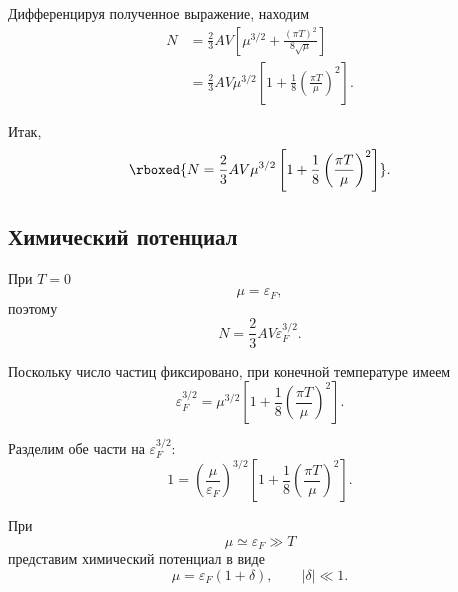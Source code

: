 \documentclass[../final.tex]{subfiles}
\begin{document}
Дифференцируя полученное выражение, находим
%
\begin{align*}
    N
    &=
    \frac{2}{3}AV
    \left[
        \mu^{3/2}
        +
        \frac{(\pi T)^2}{8\sqrt{\mu}}
    \right]
    \\[4pt]
    &=
    \frac{2}{3}AV
    \mu^{3/2}
    \left[
        1
        +
        \frac{1}{8}
        \left(
            \frac{\pi T}{\mu}
        \right)^2
    \right].
\end{align*}

Итак,
%
\[
    \rboxed{
        N
        =
        \frac{2}{3}AV
        \mu^{3/2}
        \left[
            1
            +
            \frac{1}{8}
            \left(
                \frac{\pi T}{\mu}
            \right)^2
        \right]
    }.
\]


\subsection{Химический потенциал}

При $T=0$
%
\begin{equation*}
    \mu
    =
    \varepsilon_F,
\end{equation*}
%
поэтому
%
\begin{equation*}
    N
    =
    \frac{2}{3}AV
    \varepsilon_F^{3/2}.
\end{equation*}

Поскольку число частиц фиксировано, при конечной температуре имеем
%
\begin{equation*}
    \varepsilon_F^{3/2}
    =
    \mu^{3/2}
    \left[
        1
        +
        \frac{1}{8}
        \left(
            \frac{\pi T}{\mu}
        \right)^2
    \right].
\end{equation*}

Разделим обе части на $\varepsilon_F^{3/2}$:
%
\begin{equation*}
    1
    =
    \left(
        \frac{\mu}{\varepsilon_F}
    \right)^{3/2}
    \left[
        1
        +
        \frac{1}{8}
        \left(
            \frac{\pi T}{\mu}
        \right)^2
    \right].
\end{equation*}

При
%
\begin{equation*}
    \mu
    \simeq
    \varepsilon_F
    \gg
    T
\end{equation*}
%
представим химический потенциал в виде
%
\begin{equation*}
    \mu
    =
    \varepsilon_F
    (1+\delta),
    \qquad
    |\delta|
    \ll
    1.
\end{equation*}
\end{document}
